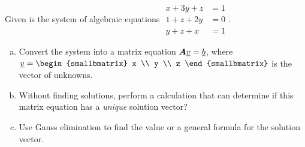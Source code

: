       \begin{question}
      Given is the system of algebraic equations \quad\quad \(
      \begin{aligned}
        x + 3y +z  &= 1 \\
        1 + z + 2y &= 0 \\
        y+z+x &= 1
      \end{aligned}
      \).
      \begin{enumerate}[(a)]
      \item Convert the system into a matrix equation \(\bm{A} \underline{v} = \underline{b}\), where \(\vv{v} =
        \begin{smallbmatrix}
          x \\ y \\ z
        \end{smallbmatrix}
        \) is the vector of unknowns.
        \solspace{1.5in}
      \item Without finding solutions, perform a calculation that can determine if this matrix equation has a \emph{unique} solution vector?
      \solspace{2in}
      \item Use Gauss elimination to find the value or a general formula for the solution vector.
      \solspace{2in}
      \end{enumerate}
      \end{question}

